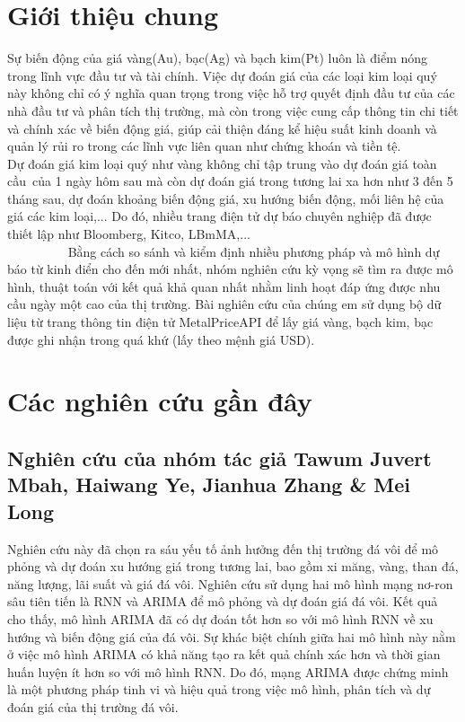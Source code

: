 \documentclass[conference]{IEEEtran}
\begin{document}
\section{Giới thiệu chung}
Sự biến động của giá vàng(Au), bạc(Ag) và bạch kim(Pt) luôn là điểm nóng trong lĩnh vực đầu tư và tài chính. Việc dự đoán giá của các loại kim loại quý này không chỉ có ý nghĩa quan trọng trong việc hỗ trợ quyết định đầu tư của các nhà đầu tư và phân tích thị trường, mà còn trong việc cung cấp thông tin chi tiết và chính xác về biến động giá, giúp cải thiện đáng kể hiệu suất kinh doanh và quản lý rủi ro trong các lĩnh vực liên quan như chứng khoán và tiền tệ. \\ 
Dự đoán giá kim loại quý như vàng không chỉ tập trung vào dự đoán giá toàn cầu  của 1 ngày hôm sau mà còn dự đoán giá trong tương lai xa hơn như 3 đến 5 tháng sau, dự đoán khoảng biến động giá, xu hướng biến động, mối liên hệ của giá các kim loại,... Do đó, nhiều trang điện tử dự báo chuyên nghiệp đã được thiết lập như Bloomberg, Kitco, LBmMA,... \\
              Bằng cách so sánh và kiểm định nhiều phương pháp và mô hình dự báo từ kinh điển cho đến mới nhất, nhóm nghiên cứu kỳ vọng sẽ tìm ra được mô hình, thuật toán với kết quả khả quan nhất nhằm linh hoạt đáp ứng được nhu cầu ngày một cao của thị trường. Bài nghiên cứu của chúng em sử dụng bộ dữ liệu từ trang thông tin điện tử MetalPriceAPI để lấy giá vàng, bạch kim, bạc được ghi nhận trong quá khứ (lấy theo mệnh giá USD). 
\section{Các nghiên cứu gần đây} 

\subsection{Nghiên cứu của nhóm tác giả Tawum Juvert Mbah, Haiwang Ye, Jianhua Zhang & Mei Long} 

Nghiên cứu này đã chọn ra sáu yếu tố ảnh hưởng đến thị trường đá vôi để mô phỏng và dự đoán xu hướng giá trong tương lai, bao gồm xi măng, vàng, than đá, năng lượng, lãi suất và giá đá vôi. Nghiên cứu sử dụng hai mô hình mạng nơ-ron sâu tiên tiến là RNN và ARIMA để mô phỏng và dự đoán giá đá vôi. Kết quả cho thấy, mô hình ARIMA đã có dự đoán tốt hơn so với mô hình RNN về xu hướng và biến động giá của đá vôi. Sự khác biệt chính giữa hai mô hình này nằm ở việc mô hình ARIMA có khả năng tạo ra kết quả chính xác hơn và thời gian huấn luyện ít hơn so với mô hình RNN. Do đó, mạng ARIMA được chứng minh là một phương pháp tinh vi và hiệu quả trong việc mô hình, phân tích và dự đoán giá của thị trường đá vôi. 
\end{document}
